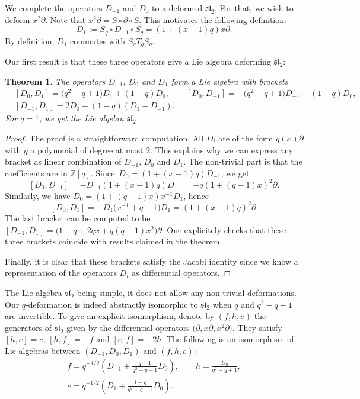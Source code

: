 \documentclass[10pt,a4paper]{amsart}
\numberwithin{equation}{section}
\newtheorem{Theorem}{Theorem}[section]
\newcommand*{\Z}{\mathbb{Z}}
\begin{document}
We complete the operators $D_{-1}$ and $D_0$ to a deformed $\mathfrak{sl}_2$. For that, we wish to deform $x^2\partial$.
Note that $x^2\partial = S\circ \partial\circ S$. This motivates the following definition:
\[
D_1:=S_q\circ D_{-1}\circ S_q=(1+(x-1)q)x\partial.
\]
By definition, $D_1$ commutes with $S_qT_qS_q$.

Our first result is that these three operators give a Lie algebra deforming $\mathfrak{sl}_2$:
\begin{Theorem}\label{Prop:deformed-sl2}
The operators $D_{-1}$, $D_0$ and $D_1$ form a Lie algebra with brackets
\begin{align*}
&[D_0,D_1]= \big(q^2-q+1\big)D_1+(1-q)D_0, \qquad
[D_0,D_{-1}] = -\big(q^2-q+1\big)D_{-1}+(1-q)D_0, \\
&[D_{-1},D_1]= 2D_0+(1-q)(D_{1}-D_{-1}).
\end{align*}
For $q=1$, we get the Lie algebra $\mathfrak{sl}_2$.
\end{Theorem}

\begin{proof}
The proof is a straightforward computation. All $D_i$ are of the form $g(x)\partial$ with $g$ a polynomial of degree at most 2. This explains why we can express any bracket as linear combination of $D_{-1}$, $D_0$ and $D_1$. The non-trivial part is that the coefficients are in $\Z[q]$.
Since~${D_0=(1+(x-1)q)D_{-1}}$, we get
\[[D_0,D_{-1}]=-D_{-1}(1+(x-1)q)D_{-1}=-q(1+(q-1)x)^2\partial.
\]
Similarly, we have $D_0=(1+(q-1)x)x^{-1}D_1$, hence
\[
[D_0,D_1]=-D_1\big(x^{-1}+q-1\big)D_1=(1+(x-1)q)^2\partial.
\]
The last bracket can be computed to be $[D_{-1},D_1]=\big(1-q+2qx+q(q-1)x^2\big)\partial$. One explicitely checks that these three brackets coincide with results claimed in the theorem.

Finally, it is clear that these brackets satisfy the Jacobi identity since we know a representation of the operators $D_i$ as differential operators.
\end{proof}

The Lie algebra $\mathfrak{sl}_2$ being simple, it does not allow any non-trivial deformations. Our $q$-deformation is indeed abstractly isomorphic to $\mathfrak{sl}_2$ when $q$ and $q^2-q+1$ are invertible. To give an explicit isomorphism, denote by $(f,h,e)$ the generators of $\mathfrak{sl}_2$ given by the differential operators $\big(\partial, x\partial, x^2\partial\big)$. They satisfy $[h,e]=e$, $[h,f]=-f$ and $[e,f]=-2h$. The following is an isomorphism of Lie algebras between $(D_{-1},D_0,D_1)$ and $(f,h,e)$:
\begin{gather*}%
f=q^{-1/2}\left(D_{-1}+\frac{q-1}{q^2-q+1}D_0\right), \qquad h=\frac{D_0}{q^2-q+1}, \\
 e=q^{-1/2}\left(D_1+\frac{1-q}{q^2-q+1}D_0\right).
\end{gather*}
\end{document}
